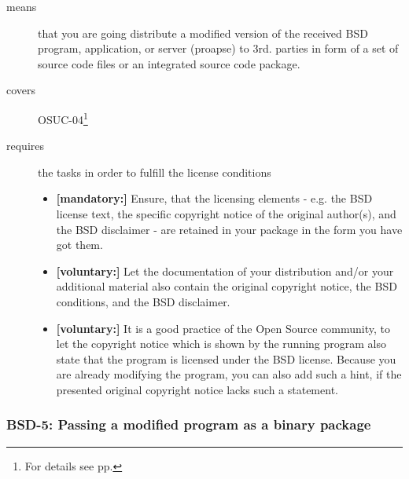 \begin{description}
\item[means] that you are going distribute a modified version of the received
BSD program, application, or server (proapse) to 3rd. parties in form of a set
of source code files or an integrated source code package.
\item[covers] OSUC-04\footnote{For details see pp. \pageref{OSUC-04-DEF}}
\item[requires] the tasks in order to fulfill the license conditions
\begin{itemize}
  \item \textbf{[mandatory:]} Ensure, that the licensing elements - e.g.
  the BSD license text, the specific copyright notice of the original author(s),
  and the BSD disclaimer - are retained in your package in the form you have got
  them. 
  \item \textbf{[voluntary:]} Let the documentation of your distribution
  and/or your additional material also contain the original copyright notice, the
  BSD conditions, and the BSD disclaimer.
  
  \item \textbf{[voluntary:]} It is a good practice of the Open Source
  community, to let the copyright notice which is shown by the running program
  also state that the program is licensed under the BSD license. Because you are
  already modifying the program, you can also add such a hint, if the presented
  original copyright notice lacks such a statement.
\end{itemize}
\end{description}

\subsubsection{BSD-5: Passing a modified program as a binary package}

